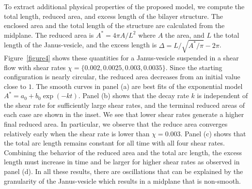 \documentclass[lineno]{jfm}
\begin{document}
To extract additional physical properties of the proposed model, we
compute the total length, reduced area, and excess length of the bilayer
structure. The enclosed area and the total length of the structure are
calculated from the midplane. The reduced area is $A^* = 4\pi A/L^2$
where $A$ the area, and $L$ the total length of the Janus-vesicle, and
the excess length is $\Delta=L/\sqrt{A^*/\pi}-2\pi$.
Figure~\ref{figure4} shows these quantities for a Janus-vesicle
suspended in a shear flow with shear rates
$\chi=\{0.002,0.0025,0.003,0.0035\}$. Since the starting configuration
is nearly circular, the reduced area decreases from an initial value
close to $1$. The smooth curves in panel (a) are best fits of the
exponential model $A^* = a_0 + b_0 \exp(-kt)$. Panel (b) shows that the
decay rate $k$ is independent of the shear rate for sufficiently large
shear rates, and the terminal reduced areas of each case are shown in
the inset. We see that lower shear rates generate a higher final reduced
area. In particular, we observe that the reduce area converges
relatively early when the shear rate is lower than $\chi=0.003$. 
Panel (c) shows that the total arc length remains constant for all time
with all four shear rates. Combining the behavior of the reduced area
and the total arc length, the excess length must increase in time and be
larger for higher shear rates as observed in panel (d). In all these
results, there are oscillations that can be explained by the granularity
of the Janus-vesicle which results in a midplane that is non-smooth.
\end{document}
